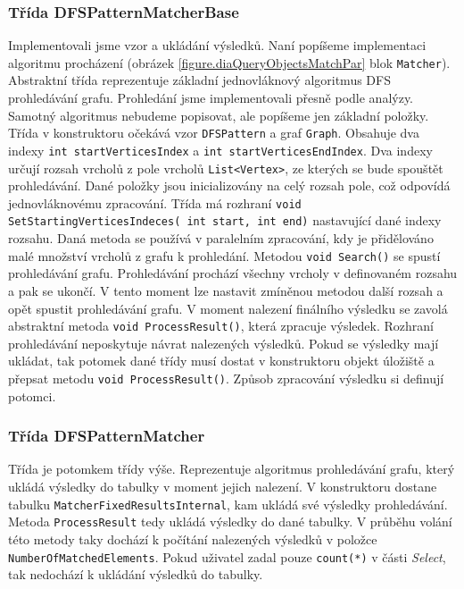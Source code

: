 \subsubsection{Třída DFSPatternMatcherBase}

Implementovali jsme vzor a ukládání výsledků.
Naní popíšeme implementaci algoritmu procházení (obrázek \ref{figure.diaQueryObjectsMatchPar} blok \texttt{Matcher}).
Abstraktní třída reprezentuje základní jednovláknový algoritmus DFS prohledávání grafu.
Prohledání jsme implementovali přesně podle analýzy.
Samotný algoritmus nebudeme popisovat, ale popíšeme jen základní položky.
Třída v konstruktoru očekává vzor \texttt{DFSPattern} a graf \texttt{Graph}.
Obsahuje dva indexy \texttt{int startVerticesIndex} a \texttt{int startVerticesEndIndex}.
Dva indexy určují rozsah vrcholů z pole vrcholů \texttt{List<Vertex>}, ze kterých se bude spouštět prohledávání.
Dané položky jsou inicializovány na celý rozsah pole, což odpovídá jednovláknovému zpracování.
Třída má rozhraní \texttt{void SetStartingVerticesIndeces( int start, int end)} nastavující dané indexy rozsahu.
Daná metoda se používá v paralelním zpracování, kdy je přidělováno malé množství vrcholů z grafu k prohledání.
Metodou \texttt{void Search()} se spustí prohledávání grafu.
Prohledávání prochází všechny vrcholy v definovaném rozsahu a pak se ukončí.
V tento moment lze nastavit zmíněnou metodou další rozsah a opět spustit prohledávání grafu.
V moment nalezení finálního výsledku se zavolá abstraktní metoda \texttt{void ProcessResult()}, která zpracuje výsledek.
Rozhraní prohledávání neposkytuje návrat nalezených výsledků.
Pokud se výsledky mají ukládat, tak potomek dané třídy musí dostat v konstruktoru objekt úložiště a přepsat metodu \texttt{void ProcessResult()}.
Způsob zpracování výsledku si definují potomci.

\subsubsection{Třída DFSPatternMatcher}

Třída je potomkem třídy výše.
Reprezentuje algoritmus prohledávání grafu, který ukládá výsledky do tabulky v moment jejich nalezení.
V konstruktoru dostane tabulku \texttt{MatcherFixedResultsInternal}, kam ukládá své výsledky prohledávání.
Metoda \texttt{ProcessResult} tedy ukládá výsledky do dané tabulky.
V průběhu volání této metody taky dochází k počítání nalezených výsledků v položce \texttt{NumberOfMatchedElements}.
Pokud uživatel zadal pouze \texttt{count(*)} v části \textit{Select}, tak nedochází k ukládání výsledků do tabulky.


